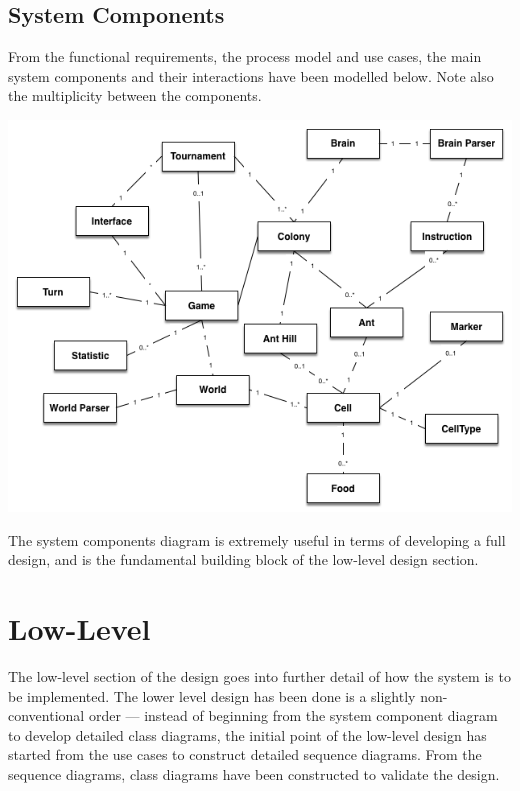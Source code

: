 \documentclass[11pt]{article}
\begin{document}
\subsection{System Components}\label{system-components}

From the functional requirements, the process model and use cases, the
main system components and their interactions have been modelled below. Note also the multiplicity between the components.

\begin{center}
\includegraphics[width=\textwidth]{high-level-diagrams/system-components.png}
\end{center}

The system components diagram is extremely useful in terms of developing
a full design, and is the fundamental building block of the low-level
design section.

\newpage
\section{Low-Level}

The low-level section of the design goes into further detail of how the system is to be implemented. The lower level design has been done is a slightly non-conventional order --- instead of beginning from the system component diagram to develop detailed class diagrams, the initial point of the low-level design has started from the use cases to construct detailed sequence diagrams. From the sequence diagrams, class diagrams have been constructed to validate the design.
\end{document}
